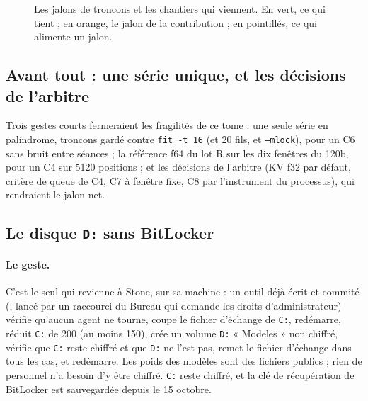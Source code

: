 \begin{figure}[ht]
\centering
\SchemaResJalons
\caption[Les jalons et les chantiers qui viennent]{Les jalons de troncons et les chantiers qui viennent. En vert, ce qui tient ; en orange, le jalon de la contribution ; en pointillés, ce qui alimente un jalon.}
\label{t2d-fig:jalons}
\end{figure}

\subsection{Avant tout : une série unique, et les décisions de l'arbitre}

Trois gestes courts fermeraient les fragilités de ce tome : une seule série en palindrome, troncons gardé contre \texttt{fit -t 16} (et 20 fils, et \texttt{--mlock}), pour un C6 sans bruit entre séances ; la référence f64 du lot R sur les dix fenêtres du 120b, pour un C4 sur \num{5120} positions ; et les décisions de l'arbitre (KV f32 par défaut, critère de queue de C4, C7 à fenêtre fixe, C8 par l'instrument du processus), qui rendraient le jalon net.

\subsection{Le disque \texttt{D:} sans BitLocker}\label{t2d-sec:disque}

\paragraph{Le geste.} C'est le seul qui revienne à Stone, sur sa machine : un outil déjà écrit et commité (, lancé par un raccourci du Bureau qui demande les droits d'administrateur) vérifie qu'aucun agent ne tourne, coupe le fichier d'échange de \texttt{C:}, redémarre, réduit \texttt{C:} de \SI{200}{\Go} (au moins 150), crée un volume \texttt{D:} « Modeles » non chiffré, vérifie que \texttt{C:} reste chiffré et que \texttt{D:} ne l'est pas, remet le fichier d'échange dans tous les cas, et redémarre. Les poids des modèles sont des fichiers publics ; rien de personnel n'a besoin d'y être chiffré. \texttt{C:} reste chiffré, et la clé de récupération de BitLocker est sauvegardée depuis le 15 octobre.

